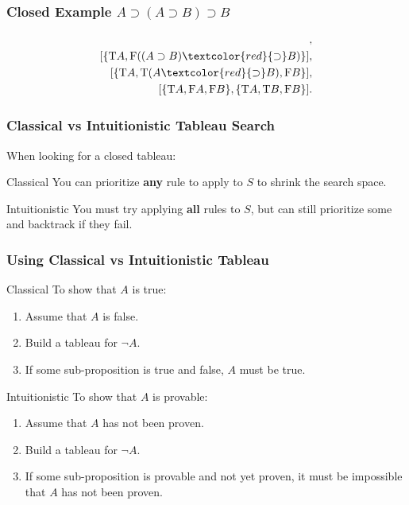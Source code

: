 \documentclass[mathserif]{beamer}
\def\T{\textrm{T}}
\def\F{\textrm{F}}
\def\imp{\supset}
\newcommand{\diff}[1]{\textcolor{red}{#1}}
\begin{document}
\begin{frame}
\frametitle{Closed Example $A \imp (A \imp B) \imp B$}

\begin{align*}
[\{ \F(A \diff{\imp} (A \imp B) \imp B) \}],\\
[\{ \T A , \F((A \imp B) \diff{\imp} B) \}],\\
[\{ \T A, \T(A \diff{\imp} B) , \F B \}],\\
[\{ \T A, \F A, \F B \}, \{ \T A, \T B , \F B \}].
\end{align*}

\end{frame}


\begin{frame}
\frametitle{Classical vs Intuitionistic Tableau Search}

When looking for a closed tableau:

\begin{block}{Classical}
You can prioritize {\bf any} rule to apply to $S$ to shrink the search space.
\end{block}

\begin{block}{Intuitionistic}
You must try applying {\bf all} rules to $S$,
but can still prioritize some and backtrack if they fail.
\end{block}

\end{frame}

\begin{frame}
\frametitle{Using Classical vs Intuitionistic Tableau}

\begin{block}{Classical}
To show that $A$ is true:
\begin{enumerate}
\item Assume that $A$ is false.
\item Build a tableau for $\neg A$.
\item If some sub-proposition is true and false, $A$ must be true.
\end{enumerate}
\end{block}

\begin{block}{Intuitionistic}
To show that $A$ is provable:
\begin{enumerate}
\item Assume that $A$ has not been proven.
\item Build a tableau for $\neg A$.
\item If some sub-proposition is provable and not yet proven,
it must be impossible that $A$ has not been proven.
\end{enumerate}
\end{block}

\end{frame}
\end{document}
